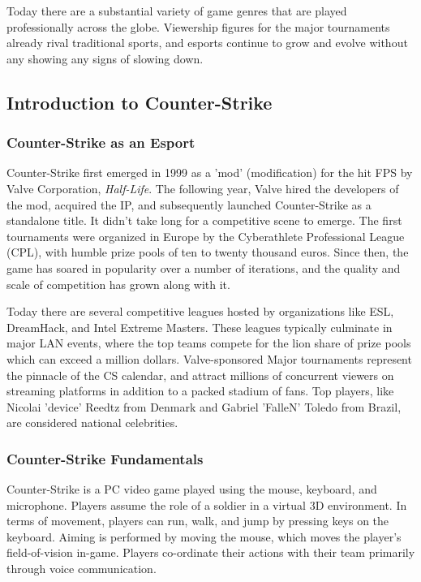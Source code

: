Today there are a substantial variety of game genres that are played professionally across the globe. Viewership figures for the major tournaments already rival traditional sports, and esports continue to grow and evolve without any showing any signs of slowing down. \cite{proesports-book}

\subsection{Introduction to Counter-Strike}

\subsubsection{Counter-Strike as an Esport}

Counter-Strike first emerged in 1999 as a 'mod' (modification) for the hit FPS by Valve Corporation, \textit{Half-Life}. The following year, Valve hired the developers of the mod, acquired the IP, and subsequently launched Counter-Strike as a standalone title. It didn't take long for a competitive scene to emerge. The first tournaments were organized in Europe by the Cyberathlete Professional League (CPL), with humble prize pools of ten to twenty thousand euros. Since then, the game has soared in popularity over a number of iterations, and the quality and scale of competition has grown along with it. 

Today there are several competitive leagues hosted by organizations like ESL, DreamHack, and Intel Extreme Masters. These leagues typically culminate in major LAN events, where the top teams compete for the lion share of prize pools which can exceed a million dollars. Valve-sponsored Major tournaments represent the pinnacle of the CS calendar, and attract millions of concurrent viewers on streaming platforms in addition to a packed stadium of fans. Top players, like  Nicolai 'device' Reedtz from Denmark and Gabriel 'FalleN' Toledo from Brazil, are considered national celebrities.

\subsubsection{Counter-Strike Fundamentals}

Counter-Strike is a PC video game played using the mouse, keyboard, and microphone. Players assume the role of a soldier in a virtual 3D environment. In terms of movement, players can run, walk, and jump by pressing keys on the keyboard. Aiming is performed by moving the mouse, which moves the player's field-of-vision in-game. Players co-ordinate their actions with their team primarily through voice communication. 

